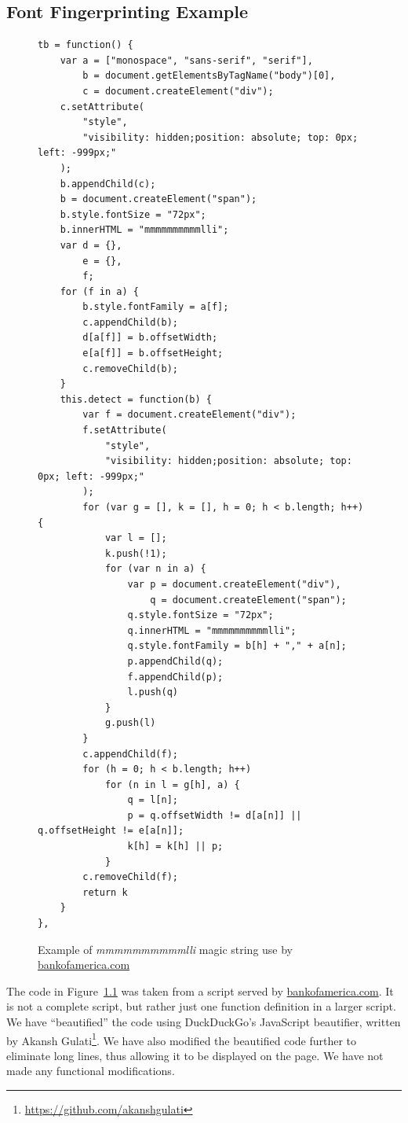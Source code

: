 \documentclass[
    fontsize=12pt,
    headings=small,
    parskip=half,
    bibliography=totoc,
    numbers=noenddot,
    open=any
    ]{scrreprt}
\begin{document}
\begin{appendices}
\chapter{Font Fingerprinting Example}
\begin{figure}
\begin{verbatim}
tb = function() {
    var a = ["monospace", "sans-serif", "serif"],
        b = document.getElementsByTagName("body")[0],
        c = document.createElement("div");
    c.setAttribute(
        "style",
        "visibility: hidden;position: absolute; top: 0px; left: -999px;"
    );
    b.appendChild(c);
    b = document.createElement("span");
    b.style.fontSize = "72px";
    b.innerHTML = "mmmmmmmmmmlli";
    var d = {},
        e = {},
        f;
    for (f in a) {
        b.style.fontFamily = a[f];
        c.appendChild(b);
        d[a[f]] = b.offsetWidth;
        e[a[f]] = b.offsetHeight;
        c.removeChild(b);
    }
    this.detect = function(b) {
        var f = document.createElement("div");
        f.setAttribute(
            "style",
            "visibility: hidden;position: absolute; top: 0px; left: -999px;"
        );
        for (var g = [], k = [], h = 0; h < b.length; h++) {
            var l = [];
            k.push(!1);
            for (var n in a) {
                var p = document.createElement("div"),
                    q = document.createElement("span");
                q.style.fontSize = "72px";
                q.innerHTML = "mmmmmmmmmmlli";
                q.style.fontFamily = b[h] + "," + a[n];
                p.appendChild(q);
                f.appendChild(p);
                l.push(q)
            }
            g.push(l)
        }
        c.appendChild(f);
        for (h = 0; h < b.length; h++)
            for (n in l = g[h], a) {
                q = l[n];
                p = q.offsetWidth != d[a[n]] || q.offsetHeight != e[a[n]];
                k[h] = k[h] || p;
            }
        c.removeChild(f);
        return k
    }
},
\end{verbatim}
\caption{Example of \textit{mmmmmmmmmmlli} magic string use by \url{bankofamerica.com}}
\label{app:mmmmmmmmmmlli}
\end{figure}

The code in Figure~\ref{app:mmmmmmmmmmlli} was taken from a script served by \url{bankofamerica.com}.
It is not a complete script, but rather just one function definition in a larger script.
We have ``beautified'' the code using DuckDuckGo's JavaScript beautifier, written by Akansh Gulati\footnote{\url{https://github.com/akanshgulati}}.
We have also modified the beautified code further to eliminate long lines, thus allowing it to be displayed
on the page.
We have not made any functional modifications.


\end{appendices}
\end{document}
